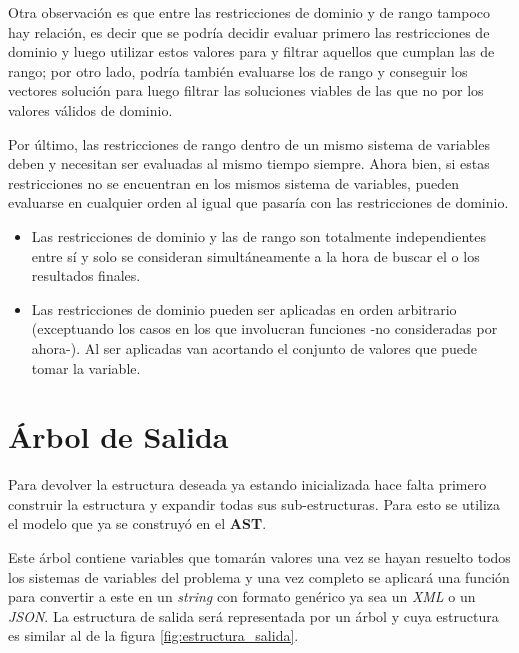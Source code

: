 Otra observación es que entre las restricciones de dominio y de rango tampoco hay 
relación, es decir que se podría decidir evaluar primero las restricciones de 
dominio y luego utilizar estos valores para y filtrar aquellos que cumplan las 
de rango; por otro lado, podría también evaluarse los de rango y conseguir los vectores solución 
para luego filtrar las soluciones viables de las que no por los valores válidos 
de dominio.

Por último, las restricciones de rango dentro de un mismo sistema de variables
deben y necesitan ser evaluadas al mismo 
tiempo siempre. 
Ahora bien, si estas restricciones no se encuentran en los mismos sistema de variables,
pueden evaluarse en cualquier orden al igual que pasaría con las 
restricciones de dominio.

\begin{itemize}
 \item {Las restricciones de dominio y las de rango son totalmente independientes 
  entre sí y solo se consideran simultáneamente a la hora de buscar el o los 
  resultados finales.}
 \item {Las restricciones de dominio pueden ser aplicadas en orden arbitrario 
  (exceptuando los casos en los que involucran funciones -no consideradas por 
  ahora-). Al ser aplicadas van acortando el conjunto de valores que puede tomar 
  la variable.}
\end{itemize}

\section{Árbol de Salida}
\label{arbol_de_salida}
Para devolver la estructura deseada ya estando inicializada hace falta primero 
construir la estructura y expandir todas sus sub-estructuras. Para esto se utiliza 
el modelo que ya se construyó en el \textbf{AST}.

Este árbol contiene variables que tomarán valores una vez se hayan resuelto todos
los sistemas de variables del problema y una vez completo se aplicará una función 
para convertir a este en un \emph{string} con formato genérico ya sea un \emph{XML} o un \emph{JSON}.
La estructura de salida será representada por un árbol y cuya estructura es similar al de la figura 
\ref{fig:estructura_salida}.

